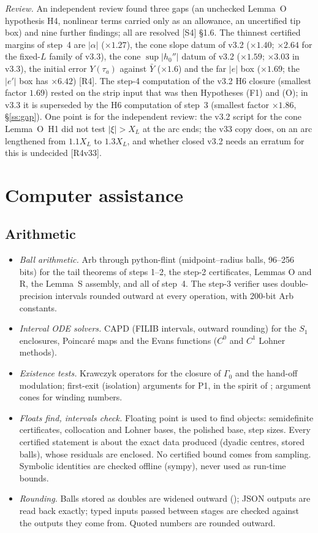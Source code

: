 \documentclass[11pt]{amsart}
\theoremstyle{definition}
\theoremstyle{remark}
\newcommand{\fn}[1]{\texttt{\detokenize{#1}}}
\newcommand{\dref}[1]{[\textsf{#1}]}
\begin{document}
\emph{Review.} An independent review found three gaps (an unchecked Lemma~O hypothesis H4, nonlinear terms carried only as an allowance, an uncertified tip box) and nine further findings; all are resolved \dref{S4} \S1.6. The thinnest certified margins of step~4 are $|\alpha|$ ($\times1.27$), the cone slope datum of v3.2 ($\times1.40$; $\times2.64$ for the fixed-$L$ family of v3.3), the cone $\sup|h_0''|$ datum of v3.2 ($\times1.59$; $\times3.03$ in v3.3), the initial error $Y(\tau_a)$ against $\bar Y$ ($\times1.6$) and the far $|e|$ box ($\times1.69$; the $|e'|$ box has $\times6.42$) \dref{R4}. The step-4 computation of the v3.2 H6 closure (smallest factor $1.69$) rested on the strip input that was then Hypotheses (F1) and (O); in v3.3 it is superseded by the H6 computation of step~3 (smallest factor $\times1.86$, \S\ref{ss:gap}). One point is for the independent review: the v3.2 script for the cone Lemma~O~H1 did not test $|\xi|>X_L$ at the arc ends; the v33 copy does, on an arc lengthened from $1.1X_L$ to $1.3X_L$, and whether closed v3.2 needs an erratum for this is undecided \dref{R4v33}.

\section{Computer assistance}\label{s:cap}

\subsection{Arithmetic}
\begin{itemize}[leftmargin=*,itemsep=1pt]
\item \emph{Ball arithmetic.} Arb \cite{Johansson2017} through python-flint (midpoint--radius balls, 96--256 bits) for the tail theorems of steps 1--2, the step-2 certificates, Lemmas O and R, the Lemma~S assembly, and all of step~4. The step-3 verifier uses double-precision intervals rounded outward at every operation, with 200-bit Arb constants.
\item \emph{Interval ODE solvers.} CAPD \cite{CAPD2021} (FILIB intervals, outward rounding) for the $S_1$ enclosures, Poincar\'e maps and the Evans functions ($C^0$ and $C^1$ Lohner methods).
\item \emph{Existence tests.} Krawczyk operators \cite{Krawczyk1969} for the closure of $\Gamma_0$ and the hand-off modulation; first-exit (isolation) arguments for P1, in the spirit of \cite{Zgliczynski2004}; argument cones for winding numbers.
\item \emph{Floats find, intervals check.} Floating point is used to find objects: semidefinite certificates, collocation and Lohner bases, the polished base, step sizes. Every certified statement is about the exact data produced (dyadic centres, stored balls), whose residuals are enclosed. No certified bound comes from sampling. Symbolic identities are checked offline (sympy), never used as run-time bounds.
\item \emph{Rounding.} Balls stored as doubles are widened outward (\fn{nextafter}); JSON outputs are read back exactly; typed inputs passed between stages are checked against the outputs they come from. Quoted numbers are rounded outward.
\end{itemize}
\end{document}
